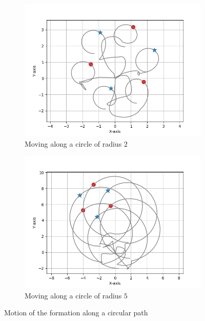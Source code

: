 \documentclass[a4paper,11pt,oneside]{book}
\begin{document}
\begin{figure}[h]
\centering
	\begin{subfigure}{0.49\textwidth}	
	\includegraphics[scale=0.42]{Moving_hexagon_formation_circle_r_2}
	\caption{Moving along a circle of radius $2$}
	\end{subfigure}
\hfill
	\begin{subfigure}{0.49\textwidth}	
	\includegraphics[scale=0.42]{Moving_hexagon_formation_circle_r_5}
	\caption{Moving along a circle of radius $5$}
	\end{subfigure}
\caption{Motion of the formation along a circular path}
\label{Formation_motion_circle}
\end{figure}
\end{document}
